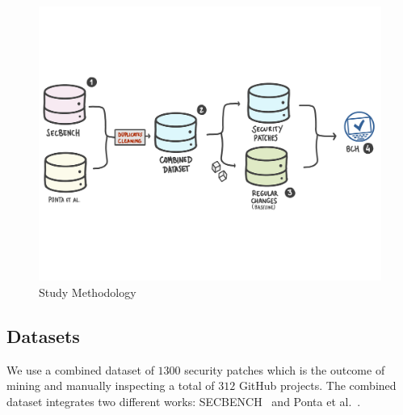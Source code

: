 \documentclass[smallextended]{svjour3}       %
\begin{document}
\begin{figure}[h]
	\centering 	
    \begin{adjustwidth}{-0.5cm}{-0.5cm}  
      \vspace{-2.5cm} 
	\includegraphics[width=1.1\textwidth]{figures/methodology.pdf}
  \vspace{-3cm} 
  \caption{Study Methodology}
	\label{fig:met}
	 \end{adjustwidth}
\end{figure}
%
\subsection{Datasets}
%

We use a combined dataset of $1300$ security patches which is 
the outcome of mining and manually inspecting a total of $312$ 
GitHub projects. The combined dataset integrates two different
works: SECBENCH~\cite{reis2017secbench,Reis:2017:IJSSE} and Ponta et al.~\cite{10.1109/MSR.2019.00064}.
\end{document}
